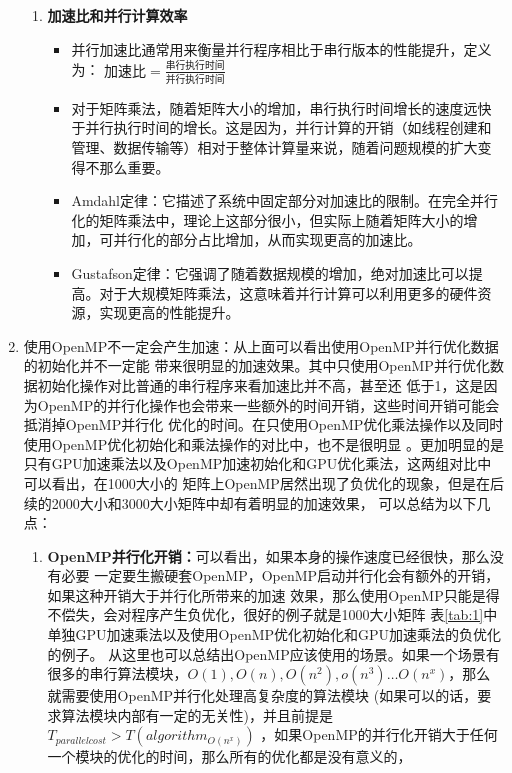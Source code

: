 \documentclass{article}
\begin{document}
\begin{enumerate}
\begin{enumerate}
        \item \textbf{加速比和并行计算效率}
        \begin{itemize}
          \item 并行加速比通常用来衡量并行程序相比于串行版本的性能提升，定义为：
          $ 加速比 = \frac{串行执行时间}{并行执行时间} $
          \item 对于矩阵乘法，随着矩阵大小的增加，串行执行时间增长的速度远快于并行执行时间的增长。这是因为，并行计算的开销（如线程创建和管理、数据传输等）相对于整体计算量来说，随着问题规模的扩大变得不那么重要。
          \item Amdahl定律：它描述了系统中固定部分对加速比的限制。在完全并行化的矩阵乘法中，理论上这部分很小，但实际上随着矩阵大小的增加，可并行化的部分占比增加，从而实现更高的加速比。
          \item Gustafson定律：它强调了随着数据规模的增加，绝对加速比可以提高。对于大规模矩阵乘法，这意味着并行计算可以利用更多的硬件资源，实现更高的性能提升。
        \end{itemize}
      \end{enumerate}
      \item 使用OpenMP不一定会产生加速：从上面可以看出使用OpenMP并行优化数据的初始化并不一定能
      带来很明显的加速效果。其中只使用OpenMP并行优化数据初始化操作对比普通的串行程序来看加速比并不高，甚至还
      低于1，这是因为OpenMP的并行化操作也会带来一些额外的时间开销，这些时间开销可能会抵消掉OpenMP并行化
      优化的时间。在只使用OpenMP优化乘法操作以及同时使用OpenMP优化初始化和乘法操作的对比中，也不是很明显
      。更加明显的是只有GPU加速乘法以及OpenMP加速初始化和GPU优化乘法，这两组对比中可以看出，在1000大小的
      矩阵上OpenMP居然出现了负优化的现象，但是在后续的2000大小和3000大小矩阵中却有着明显的加速效果，
      可以总结为以下几点：
      \begin{enumerate}
        \item \textbf{OpenMP并行化开销：}可以看出，如果本身的操作速度已经很快，那么没有必要
        一定要生搬硬套OpenMP，OpenMP启动并行化会有额外的开销，如果这种开销大于并行化所带来的加速
        效果，那么使用OpenMP只能是得不偿失，会对程序产生负优化，很好的例子就是1000大小矩阵
        表\ref{tab:1}中单独GPU加速乘法以及使用OpenMP优化初始化和GPU加速乘法的负优化的例子。
        从这里也可以总结出OpenMP应该使用的场景。如果一个场景有很多的串行算法模块，$O(1),O(n)
        ,O(n^2),o(n^3) \dots O(n^x)$，那么就需要使用OpenMP并行化处理高复杂度的算法模块
        (如果可以的话，要求算法模块内部有一定的无关性)，并且前提是$T_{parallel cost}>T(algorithm_{O(n^x)})$
        ，如果OpenMP的并行化开销大于任何一个模块的优化的时间，那么所有的优化都是没有意义的，

\end{enumerate}
\end{enumerate}
\end{document}
